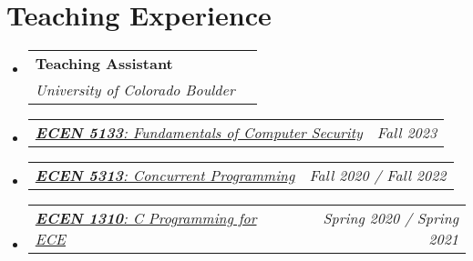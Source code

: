 \documentclass[letterpaper,11pt]{article}
\makeatletter
\newcommand{\resumeSubheading}[4]{
  \vspace{-2pt}\item
    \begin{tabular*}{0.97\textwidth}[t]{l@{\extracolsep{\fill}}r}
      \textbf{#1} & #2 \\
      \textit{\small#3} & \textit{\small #4} \\
    \end{tabular*}\vspace{-7pt}
}
\newcommand{\resumeSubSubheading}[2]{
    \item
    \begin{tabular*}{0.97\textwidth}{l@{\extracolsep{\fill}}r}
      \textit{\small#1} & \textit{\small #2} \\
    \end{tabular*}\vspace{-7pt}
}
\newcommand{\resumeSubHeadingListStart}{\begin{itemize}[leftmargin=0.15in, label={}]}
\newcommand{\resumeSubHeadingListEnd}{\end{itemize}}
\makeatother
\begin{document}
\section{Teaching Experience}
\resumeSubHeadingListStart
\resumeSubheading
{Teaching Assistant}{}
{University of Colorado Boulder}{}
\resumeSubSubheading
{\href{https://experts.colorado.edu/display/coursename_ECEN-5133}{\textbf{ECEN 5133}: Fundamentals of Computer Security}}{Fall 2023}
\resumeSubSubheading
{\href{https://experts.colorado.edu/display/coursename_ECEN-5313}{\textbf{ECEN 5313}: Concurrent Programming}}{Fall 2020 / Fall 2022}
\resumeSubSubheading
{\href{https://experts.colorado.edu/display/coursename_ECEN-1310}{\textbf{ECEN 1310}: C Programming for ECE}}{Spring 2020 / Spring 2021}\resumeSubHeadingListEnd
\vspace{1pt}
\end{document}
